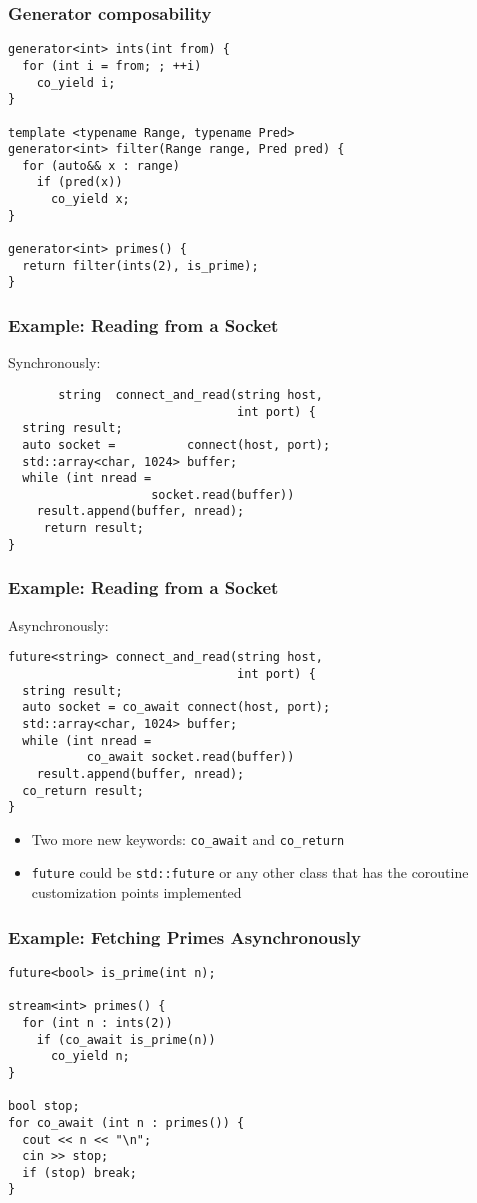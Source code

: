 \documentclass[aspectratio=43]{beamer}
\begin{document}
\begin{frame}[fragile]
  \frametitle{Generator composability}
\begin{lstlisting}
generator<int> ints(int from) {
  for (int i = from; ; ++i)
    co_yield i;
}

template <typename Range, typename Pred>
generator<int> filter(Range range, Pred pred) {
  for (auto&& x : range)
    if (pred(x))
      co_yield x;
}

generator<int> primes() {
  return filter(ints(2), is_prime);
}
\end{lstlisting}
\end{frame}


\begin{frame}[fragile,t]
  \frametitle{Example: Reading from a Socket}
  Synchronously:
\begin{lstlisting}
       string  connect_and_read(string host,
                                int port) {
  string result;
  auto socket =          connect(host, port);
  std::array<char, 1024> buffer;
  while (int nread =
                    socket.read(buffer))
    result.append(buffer, nread);
     return result;
}
\end{lstlisting}
\end{frame}
\begin{frame}[fragile,t]
  \frametitle{Example: Reading from a Socket}
  Asynchronously:
\begin{lstlisting}
future<string> connect_and_read(string host,
                                int port) {
  string result;
  auto socket = co_await connect(host, port);
  std::array<char, 1024> buffer;
  while (int nread =
           co_await socket.read(buffer))
    result.append(buffer, nread);
  co_return result;
}
\end{lstlisting}
  \begin{itemize}
  \item Two more new keywords: \lstinline~co_await~ and \lstinline~co_return~
  \item \lstinline~future~ could be \lstinline~std::future~ or any other class that has the
    coroutine customization points implemented
  \end{itemize}
\end{frame}

\begin{frame}[fragile]
  \frametitle{Example: Fetching Primes Asynchronously}
\begin{lstlisting}
future<bool> is_prime(int n);

stream<int> primes() {
  for (int n : ints(2))
    if (co_await is_prime(n))
      co_yield n;
}

bool stop;
for co_await (int n : primes()) {
  cout << n << "\n";
  cin >> stop;
  if (stop) break;
}
\end{lstlisting}
\end{frame}
\end{document}
